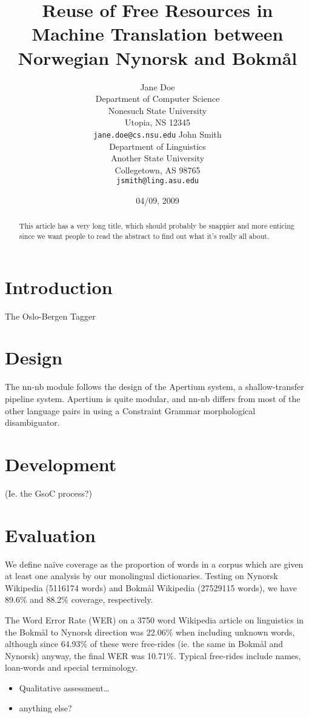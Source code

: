 \documentclass[11pt]{article}
\author{Jane Doe\\  Department of Computer Science \\  Nonesuch State University \\  Utopia, NS 12345 \\  {\tt jane.doe@cs.nsu.edu} \And  John Smith \\  Department of Linguistics \\  Another State University \\  Collegetown, AS 98765 \\    {\tt jsmith@ling.asu.edu}}
\title{Reuse of Free Resources in Machine Translation between Norwegian Nynorsk and Bokmål}
\date{04/09, 2009}
\begin{document}
\maketitle


\begin{abstract}

  This article has a very long title, which should probably be snappier and more enticing since we want people to read the abstract to find out what it's really all about.
\end{abstract}

\section{Introduction}
\label{sec-1}

The Oslo-Bergen Tagger \citep{hagen2000cbt}
\section{Design}
\label{sec-2}

The nn-nb module follows the design of the Apertium
system\citep{todo}, a shallow-transfer pipeline system. Apertium is
quite modular, and nn-nb differs from most of the other language pairs
in using a Constraint Grammar morphological disambiguator.
\section{Development}
\label{sec-3}

(Ie. the GsoC process?)
\section{Evaluation}
\label{sec-4}

We define naïve coverage as the proportion of words in a corpus which
are given at least one analysis by our monolingual
dictionaries. Testing on Nynorsk Wikipedia (5116174 words) and Bokmål
Wikipedia (27529115 words), we have 89.6\% and 88.2\% coverage,
respectively.

The Word Error Rate (WER) on a 3750 word Wikipedia article on
linguistics in the Bokmål to Nynorsk direction was 22.06\% when
including unknown words, although since 64.93\% of these were
free-rides (ie. the same in Bokmål and Nynorsk) anyway, the final WER
was 10.71\%. Typical free-rides include names, loan-words and special
terminology.

\begin{itemize}
\item Qualitative assessment\ldots{}
\item anything else?
\end{itemize}
\end{document}
